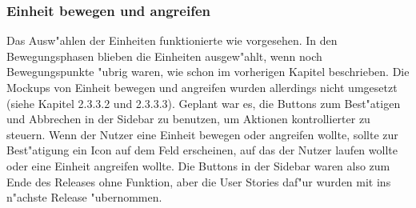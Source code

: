 \documentclass[12pt, titlepage]{scrartcl}
\begin{document}
			\subsubsection{Einheit bewegen und angreifen}
				Das Ausw"ahlen der Einheiten funktionierte wie vorgesehen. In den Bewegungsphasen blieben die Einheiten ausgew"ahlt, wenn noch Bewegungspunkte "ubrig waren, wie schon im vorherigen Kapitel beschrieben. Die Mockups von Einheit bewegen und angreifen wurden allerdings nicht umgesetzt (siehe Kapitel 2.3.3.2 und 2.3.3.3). Geplant war es, die Buttons zum Best"atigen und Abbrechen in der Sidebar zu benutzen, um Aktionen kontrollierter zu steuern. Wenn der Nutzer eine Einheit bewegen oder angreifen wollte, sollte zur Best"atigung ein Icon auf dem Feld erscheinen, auf das der Nutzer laufen wollte oder eine Einheit angreifen wollte. Die Buttons in der Sidebar waren also zum Ende des Releases ohne Funktion, aber die User Stories daf"ur wurden mit ins n"achste Release "ubernommen.
\end{document}

